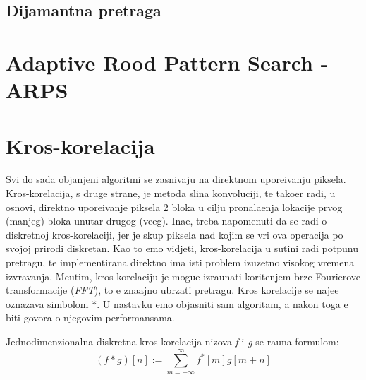\subsection{Dijamantna pretraga}

\section{Adaptive Rood Pattern Search - ARPS}

\section{Kros-korelacija} %
Svi do sada obja\sh njeni algoritmi se zasnivaju na direktnom upore\dj ivanju piksela. Kros-korelacija, s druge strane, je metoda sli\ch na konvoluciji, te tako\dj er radi, u osnovi, direktno upore\dj ivanje piksela 2 bloka u
cilju pronala\zh enja lokacije prvog (manjeg) bloka unutar drugog (ve\cj eg). Ina\ch e, treba napomenuti da se radi o diskretnoj kros-korelaciji, jer je skup piksela nad kojim se vr\sh i ova operacija po svojoj prirodi
diskretan. Kao \sh to \cj emo vidjeti, kros-korelacija u su\sh tini radi potpunu pretragu, te implementirana direktno ima isti problem izuzetno visokog vremena izvr\sh avanja. Me\dj utim, kros-korelaciju je mogu\cj e
izra\ch unati kori\sh tenjem brze Fourierove transformacije (\textit{FFT}), \sh to \cj e zna\ch ajno ubrzati pretragu. Kros korelacije se naj\ch e\sh \cj e ozna\ch zava simbolom *. U nastavku \cj emo objasniti sam algoritam, 
a nakon toga \cj e biti govora o njegovim performansama.

Jednodimenzionalna diskretna kros korelacija nizova \textit{f} i \textit{g} se ra\ch una formulom: 
$$
(f * g) [n] := \sum_{m=-\infty}^{\infty}f^{*}[m]g[m+n]
$$